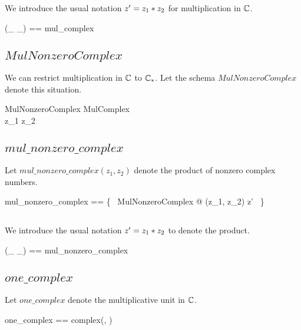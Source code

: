 \documentclass[11pt, oneside]{article}
\begin{document}
We introduce the usual notation $z' = z_1 \mathbin{*} z_2$ for multiplication in $\mathbb{C}$.

\begin{zed}
	(\_ \mulC \_) == mul\_complex
\end{zed}

\subsection{$MulNonzeroComplex$}

We can restrict multiplication in $\mathbb{C}$ to $\mathbb{C}_{*}$.
Let the schema $MulNonzeroComplex$ denote this situation.

\begin{schema}{MulNonzeroComplex}
	MulComplex \\
\where
	z_1 \in \Cnz
\also
	z_2 \in \Cnz
\end{schema}

\subsection{$mul\_nonzero\_complex$}

Let $mul\_nonzero\_complex(z_1, z_2)$ denote the product of nonzero complex numbers.

\begin{zed}
	mul\_nonzero\_complex == \{~ MulNonzeroComplex @ (z_1, z_2) \mapsto z' ~\}
\end{zed}

\subsection{}

We introduce the usual notation $z' = z_1 \mathbin{*} z_2$ to denote the product.

\begin{zed}
	(\_ \mulCnz \_) == mul\_nonzero\_complex
\end{zed}

\subsection{$one\_complex$}

Let $one\_complex$ denote the multiplicative unit in $\mathbb{C}$.

\begin{zed}
	one\_complex == complex(\oneR, \zeroR)
\end{zed}

\subsection{}
\end{document}
